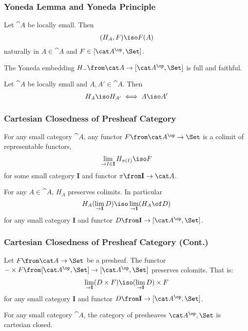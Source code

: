 \documentclass{beamer}
\begin{document}
\begin{frame}
  \frametitle{Yoneda Lemma and Yoneda Principle}
  \begin{lemma}[Yoneda]
    Let $\cat A$ be locally small. Then
    \begin{align*}
      [\cat A^\op,\Set](H_A,F)\iso F(A)
    \end{align*}
    naturally in $A\in\cat A$ and $F\in [\cat A^\op,\Set]$.
  \end{lemma}
  \begin{theorem}
    The Yoneda embedding $H_-\from \cat A\to[\cat A^\op,\Set]$ is full and faithful.
  \end{theorem}
  \begin{corollary}
    Let $\cat A$ be locally small and $A,A'\in\cat A$. Then
    \begin{align*}
      H_A\iso H_{A'} \iff A\iso A'
    \end{align*}
  \end{corollary}
\end{frame}

\begin{frame}
  \frametitle{Cartesian Closedness of Presheaf Category}
  \begin{lemma}
    For any small category $\cat A$, any functor $F\from\cat A^\op\to\Set$ is a colimit of representable functors,
    \begin{align*}
      \lim_{\to I\in\mathbf I} H_{\pi(I)}\iso F
    \end{align*}
    for some small category $\mathbf I$ and functor $\pi\from \mathbf I\to \cat A$.
  \end{lemma}
  \begin{lemma}
    For any $A\in\cat A$, $H_A$ preserves colimits. In particular $$H_A(\lim_{\to\mathbf I} D)\iso \lim_{\to\mathbf I}(H_A\of D)$$ 
    for any small category $\mathbf I$ and functor $D\from\mathbf I\to [\cat A^\op,\Set]$.
  \end{lemma}
\end{frame}

\begin{frame}
  \frametitle{Cartesian Closedness of Presheaf Category (Cont.)}
  \begin{lemma}
    Let $F\from \cat A\to\Set$ be a presheaf. The functor $-\times F\from [\cat A^\op,\Set]\to[\cat A^\op,\Set]$ preserves colomits. That is:
    \begin{align*}
      \lim_{\to \mathbf I} (D\times F)\iso (\lim_{\to \mathbf I} D)\times F
    \end{align*}
    for any small category $\mathbf I$ and functor $D\from\mathbf I\to [\cat A^\op,\Set]$.
  \end{lemma}

  \begin{theorem}
    For any small category $\cat A$, the category of presheaves $\cat A^\op,\Set$ is cartesian closed.
  \end{theorem}
\end{frame}
\end{document}
